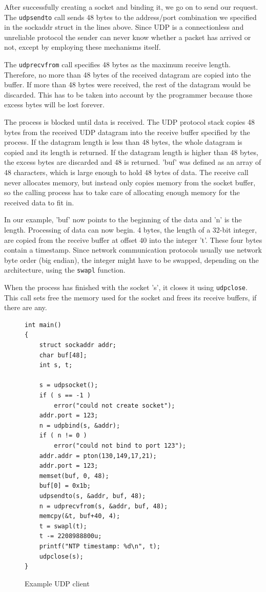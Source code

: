 \documentclass[11pt,twoside,abstract,notitlepage]{scrreprt}
\begin{document}
After successfully creating a socket and binding it, we go on to send our request. The \texttt{udpsendto} call sends 48 bytes to the address/port combination we specified in the sockaddr struct in the lines above. Since UDP is a connectionless and unreliable protocol the sender can never know whether a packet has arrived or not, except by employing these mechanisms itself.

The \texttt{udprecvfrom} call specifies 48 bytes as the maximum receive length. Therefore, no more than 48 bytes of the received datagram are copied into the buffer. If more than 48 bytes were received, the rest of the datagram would be discarded. This has to be taken into account by the programmer because those excess bytes will be lost forever.

The process is blocked until data is received. The UDP protocol stack copies 48 bytes from the received UDP datagram into the receive buffer specified by the process. If the datagram length is less than 48 bytes, the whole datagram is copied and its length is returned. If the datagram length is higher than 48 bytes, the excess bytes are discarded and 48 is returned. 'buf' was defined as an array of 48 characters, which is large enough to hold 48 bytes of data. The receive call never allocates memory, but instead only copies memory from the socket buffer, so the calling process has to take care of allocating enough memory for the received data to fit in.

In our example, 'buf' now points to the beginning of the data and 'n' is the length. Processing of data can now begin. 4 bytes, the length of a 32-bit integer, are copied from the receive buffer at offset 40 into the integer 't'. These four bytes contain a timestamp. Since network communication protocols usually use network byte order (big endian), the integer might have to be swapped, depending on the architecture, using the \texttt{swapl} function. 

When the process has finished with the socket 's', it closes it using \texttt{udpclose}. This call sets free the memory used for the socket and frees its receive buffers, if there are any. 




\begin{figure}[h]
\caption{Example UDP client}
\label{fig:udpexample}
\hline
\small
\begin{lstlisting}
int main()
{
    struct sockaddr addr;
    char buf[48];
    int s, t;

    s = udpsocket();
    if ( s == -1 )
        error("could not create socket");
    addr.port = 123;
    n = udpbind(s, &addr);
    if ( n != 0 )
        error("could not bind to port 123");
    addr.addr = pton(130,149,17,21);
    addr.port = 123;
    memset(buf, 0, 48);
    buf[0] = 0x1b;
    udpsendto(s, &addr, buf, 48);
    n = udprecvfrom(s, &addr, buf, 48);
    memcpy(&t, buf+40, 4);
    t = swapl(t);
    t -= 2208988800u;
    printf("NTP timestamp: %d\n", t);
    udpclose(s);
}
\end{lstlisting}
\hline
\end{figure}
\end{document}
